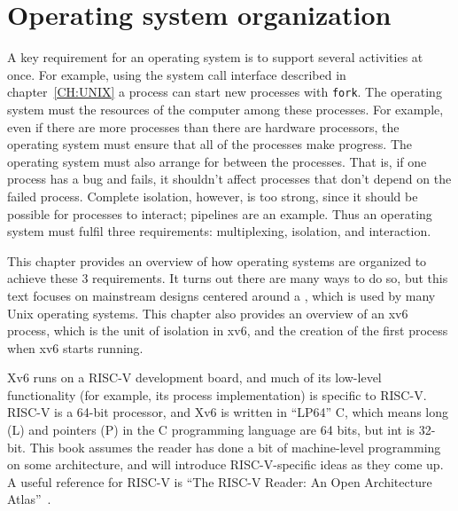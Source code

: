 
\chapter{Operating system organization}
\label{CH:FIRST}

A key requirement for an operating system is to support several activities at once.  For
example, using the system call interface described in
chapter~\ref{CH:UNIX}
a process can start new processes with 
\lstinline{fork}.
The operating system must 
the resources of the computer among these processes.
For example, even if there are more processes
than there are hardware processors, the operating
system must ensure that all of the processes
make progress.  The operating system must also arrange for
between the processes.
That is, if one process has a bug and fails, it shouldn't affect processes that
don't depend on the failed process.
Complete isolation, however, is too strong, since it should be possible for
processes to interact; pipelines are an example.
Thus
an operating system must fulfil three requirements: multiplexing, isolation,
and interaction.

This chapter provides an overview of how operating systems are
organized to achieve these 3 requirements.  It turns out there are
many ways to do so, but this text focuses on mainstream designs
centered around a , which is used by many
Unix operating systems.  This chapter also provides an overview of an
xv6 process, which is the unit of isolation in xv6, and the
creation of the first process when xv6 starts running.

Xv6 runs on a RISC-V development board, and much of its low-level
functionality (for example, its process implementation) is specific to
RISC-V.  RISC-V is a 64-bit processor, and Xv6 is written in ``LP64'' C,
which means long (L) and pointers (P) in the C programming language
are 64 bits, but int is 32-bit.  This book assumes the reader has done
a bit of machine-level programming on some architecture, and will
introduce RISC-V-specific ideas as they come up.  A useful reference
for RISC-V is ``The RISC-V Reader: An Open Architecture Atlas''~\cite{riscv}.

